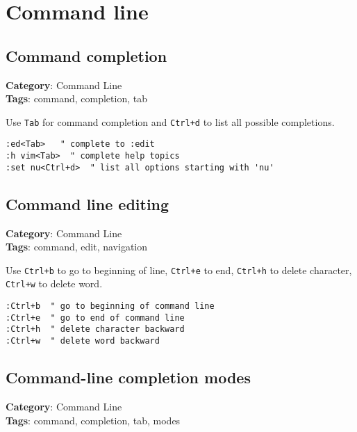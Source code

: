 {{{{\chapter{Command line}
\section{Command completion}

\textbf{Category}: Command Line\\ \textbf{Tags}: command, completion, tab
\vspace{0.5cm}

Use {\footnotesize \Verb§Tab§} for command completion and {\footnotesize \Verb§Ctrl+d§} to list all possible completions.

\begin{Exa*}{}
\begin{Verbatim}[fontsize=\footnotesize, breaklines, breakanywhere]
:ed<Tab>   " complete to :edit
:h vim<Tab>  " complete help topics
:set nu<Ctrl+d>  " list all options starting with 'nu'
\end{Verbatim}
\end{Exa*}

\section{Command line editing}

\textbf{Category}: Command Line\\ \textbf{Tags}: command, edit, navigation
\vspace{0.5cm}

Use {\footnotesize \Verb§Ctrl+b§} to go to beginning of line, {\footnotesize \Verb§Ctrl+e§} to end, {\footnotesize \Verb§Ctrl+h§} to delete character, {\footnotesize \Verb§Ctrl+w§} to delete word.

\begin{Exa*}{}
\begin{Verbatim}[fontsize=\footnotesize, breaklines, breakanywhere]
:Ctrl+b  " go to beginning of command line
:Ctrl+e  " go to end of command line
:Ctrl+h  " delete character backward
:Ctrl+w  " delete word backward
\end{Verbatim}
\end{Exa*}

\section{Command-line completion modes}

\textbf{Category}: Command Line\\ \textbf{Tags}: command, completion, tab, modes
\vspace{0.5cm}

}}}}
